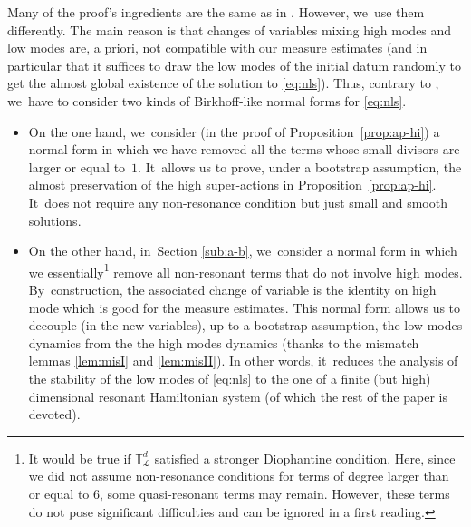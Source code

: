 \documentclass[10pt,a4paper]{amsart}
\theoremstyle{plain}
\theoremstyle{definition}
\newcommand{\1}{\mathbf{1}}
\begin{document}
Many of the proof's ingredients are the same as in \cite{BFM22}. However, we~use them differently. The main reason is that changes of variables mixing high modes and low modes are, a priori, not compatible with our measure estimates (and in particular that it suffices to draw the low modes of the initial datum randomly to get the almost global existence of the solution to \eqref{eq:nls}). Thus, contrary to \cite{BFM22}, we~have to consider two kinds of Birkhoff-like normal forms for \eqref{eq:nls}.
\begin{itemize}
\item On the one hand, we~consider (in the proof of Proposition~\ref{prop:ap-hi}) a normal form in which we have removed all the terms whose small divisors are larger or equal to~$1$. It~allows us to prove, under a bootstrap assumption, the almost preservation of the high super-actions in Proposition~\ref{prop:ap-hi}. It~does not require any non-resonance condition but just small and smooth solutions.

\item On the other hand, in~Section \ref{sub:a-b}, we~consider a normal form in which we essentially\footnote{It would be true if $\mathbb{T}^d_{\mathscr{L}}$ satisfied a stronger Diophantine condition. Here, since we did not assume non-resonance conditions for terms of degree larger than or equal to $6$, some quasi-resonant terms may remain. However, these terms do not pose significant difficulties and can be ignored in a first reading.} remove all non-resonant terms that do not involve high modes. By~construction, the associated change of variable is the identity on high mode which is good for the measure estimates. This normal form allows us to decouple (in the new variables), up to a bootstrap assumption, the low modes dynamics from the the high modes dynamics (thanks to the mismatch lemmas \ref{lem:misI} and \ref{lem:misII}). In other words, it~reduces the analysis of the stability of the low modes of \eqref{eq:nls} to the one of a finite (but high) dimensional resonant Hamiltonian system (of which the rest of the paper is devoted).
\end{itemize}
\end{document}
